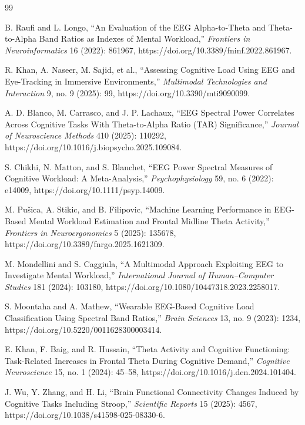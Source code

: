 \documentclass[10pt]{iopart}
\begin{document}
\begin{thebibliography}{99}
\footnotesize

B. Raufi and L. Longo, ``An Evaluation of the EEG Alpha-to-Theta
and Theta-to-Alpha Band Ratios as Indexes of Mental Workload,''
\textit{Frontiers in Neuroinformatics} 16 (2022): 861967,
https://doi.org/10.3389/fninf.2022.861967.

R. Khan, A. Naseer, M. Sajid, et al., ``Assessing Cognitive Load
Using EEG and Eye-Tracking in Immersive Environments,''
\textit{Multimodal Technologies and Interaction} 9, no. 9 (2025): 99,
https://doi.org/10.3390/mti9090099.

A. D. Blanco, M. Carrasco, and J. P. Lachaux, ``EEG Spectral Power
Correlates Across Cognitive Tasks With Theta-to-Alpha Ratio (TAR)
Significance,''
\textit{Journal of Neuroscience Methods} 410 (2025): 110292,
https://doi.org/10.1016/j.biopsycho.2025.109084.

S. Chikhi, N. Matton, and S. Blanchet, ``EEG Power Spectral Measures
of Cognitive Workload: A Meta-Analysis,''
\textit{Psychophysiology} 59, no. 6 (2022): e14009,
https://doi.org/10.1111/psyp.14009.

M. Pu\v{s}ica, A. Stikic, and B. Filipovic, ``Machine Learning
Performance in EEG-Based Mental Workload Estimation and Frontal
Midline Theta Activity,''
\textit{Frontiers in Neuroergonomics} 5 (2025): 135678,
https://doi.org/10.3389/fnrgo.2025.1621309.

M. Mondellini and S. Caggiula, ``A Multimodal Approach Exploiting EEG
to Investigate Mental Workload,''
\textit{International Journal of Human--Computer Studies} 181 (2024):
103180,
https://doi.org/10.1080/10447318.2023.2258017.

S. Moontaha and A. Mathew, ``Wearable EEG-Based Cognitive Load
Classification Using Spectral Band Ratios,''
\textit{Brain Sciences} 13, no. 9 (2023): 1234,
https://doi.org/10.5220/0011628300003414.

E. Khan, F. Baig, and R. Hussain, ``Theta Activity and Cognitive
Functioning: Task-Related Increases in Frontal Theta During Cognitive
Demand,''
\textit{Cognitive Neuroscience} 15, no. 1 (2024): 45--58,
https://doi.org/10.1016/j.dcn.2024.101404.

J. Wu, Y. Zhang, and H. Li, ``Brain Functional Connectivity Changes
Induced by Cognitive Tasks Including Stroop,''
\textit{Scientific Reports} 15 (2025): 4567,
https://doi.org/10.1038/s41598-025-08330-6.


\end{thebibliography}
\end{document}
